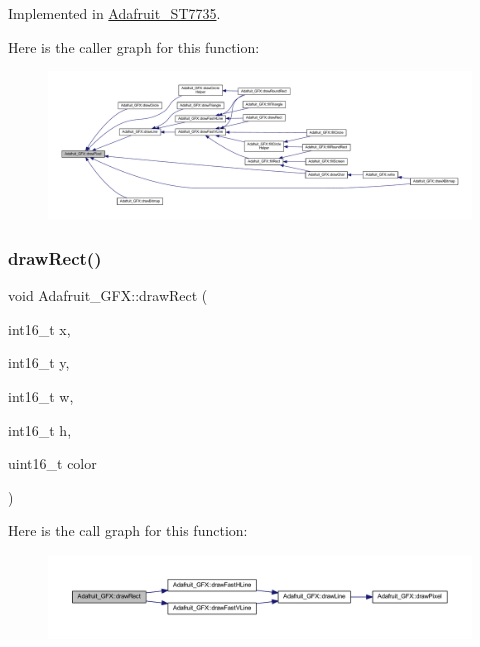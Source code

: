 Implemented in \hyperlink{class_adafruit___s_t7735_af22a5ba7282850793f4943ba2d682af0}{Adafruit\+\_\+\+S\+T7735}.

Here is the caller graph for this function\+:
\nopagebreak
\begin{figure}[H]
\begin{center}
\leavevmode
\includegraphics[width=350pt]{d9/d97/class_adafruit___g_f_x_ab7fbf72885c873266f9c7eb53b5c8896_icgraph}
\end{center}
\end{figure}
\mbox{\label{class_adafruit___g_f_x_a9ec2c2ab426503e4f7deddb93bb916f6}} 
\subsubsection{\texorpdfstring{draw\+Rect()}{drawRect()}}
{\footnotesize\ttfamily void Adafruit\+\_\+\+G\+F\+X\+::draw\+Rect (\begin{DoxyParamCaption}\item[{int16\+\_\+t}]{x,  }\item[{int16\+\_\+t}]{y,  }\item[{int16\+\_\+t}]{w,  }\item[{int16\+\_\+t}]{h,  }\item[{uint16\+\_\+t}]{color }\end{DoxyParamCaption})}

Here is the call graph for this function\+:
\nopagebreak
\begin{figure}[H]
\begin{center}
\leavevmode
\includegraphics[width=350pt]{d9/d97/class_adafruit___g_f_x_a9ec2c2ab426503e4f7deddb93bb916f6_cgraph}
\end{center}
\end{figure}
\mbox{\label{class_adafruit___g_f_x_ab496b247abec724ef80e17a30257972b}} 
